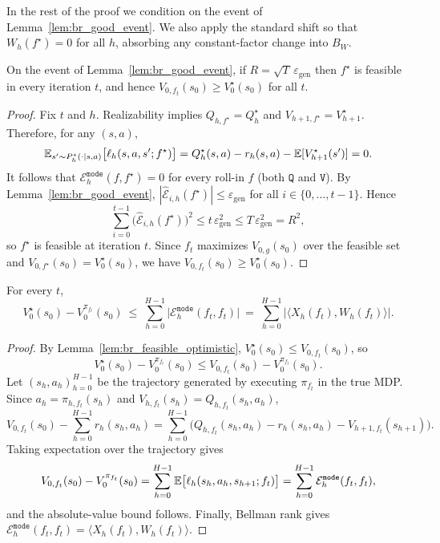 In the rest of the proof we condition on the event of Lemma~\ref{lem:br_good_event}.
We also apply the standard shift so that $W_h(f^\star)=0$ for all $h$, absorbing any constant-factor
change into $B_W$.

\begin{lemma}
\label{lem:br_feasible_optimistic}
On the event of Lemma~\ref{lem:br_good_event}, if $R=\sqrt{T}\,\varepsilon_{\mathrm{gen}}$ then
$f^\star$ is feasible in every iteration $t$, and hence $V_{0,f_t}(s_0)\ge V_0^\star(s_0)$ for all $t$.
\end{lemma}

\begin{proof}
Fix $t$ and $h$. Realizability implies $Q_{h,f^\star}=Q_h^\star$ and $V_{h+1,f^\star}=V_{h+1}^\star$.
Therefore, for any $(s,a)$,
\[
\mathbb{E}_{s'\sim P_h^\star(\cdot\mid s,a)}\big[\ell_h(s,a,s';f^\star)\big]
=
Q_h^\star(s,a)-r_h(s,a)-\mathbb{E}[V_{h+1}^\star(s')]
=0.
\]
It follows that $\mathcal{E}_h^{\mathtt{mode}}(f,f^\star)=0$ for every roll-in $f$ (both
$\mathtt{Q}$ and $\mathtt{V}$). By Lemma~\ref{lem:br_good_event},
$|\widehat{\mathcal{E}}_{i,h}(f^\star)|\le \varepsilon_{\mathrm{gen}}$ for all $i\in\{0,\dots,t-1\}$.
Hence
\[
\sum_{i=0}^{t-1}\big(\widehat{\mathcal{E}}_{i,h}(f^\star)\big)^2
\le
t\,\varepsilon_{\mathrm{gen}}^2
\le
T\,\varepsilon_{\mathrm{gen}}^2
=R^2,
\]
so $f^\star$ is feasible at iteration $t$. Since $f_t$ maximizes $V_{0,g}(s_0)$ over the feasible set and
$V_{0,f^\star}(s_0)=V_0^\star(s_0)$, we have $V_{0,f_t}(s_0)\ge V_0^\star(s_0)$.
\end{proof}

\begin{lemma}
\label{lem:br_perf_decomp}
For every $t$,
\[
V_0^\star(s_0)-V_0^{\pi_{f_t}}(s_0)
\ \le\
\sum_{h=0}^{H-1}\Big|\mathcal{E}^{\mathtt{mode}}_h(f_t,f_t)\Big|
\ =\
\sum_{h=0}^{H-1}\Big|\langle X_h(f_t),W_h(f_t)\rangle\Big|.
\]
\end{lemma}

\begin{proof}
By Lemma~\ref{lem:br_feasible_optimistic}, $V_0^\star(s_0)\le V_{0,f_t}(s_0)$, so
\[
V_0^\star(s_0)-V_0^{\pi_{f_t}}(s_0)\le V_{0,f_t}(s_0)-V_0^{\pi_{f_t}}(s_0).
\]
Let $(s_h,a_h)_{h=0}^{H-1}$ be the trajectory generated by executing $\pi_{f_t}$ in the true MDP.
Since $a_h=\pi_{h,f_t}(s_h)$ and $V_{h,f_t}(s_h)=Q_{h,f_t}(s_h,a_h)$,
\[
V_{0,f_t}(s_0)-\sum_{h=0}^{H-1} r_h(s_h,a_h)
=
\sum_{h=0}^{H-1}\big(Q_{h,f_t}(s_h,a_h)-r_h(s_h,a_h)-V_{h+1,f_t}(s_{h+1})\big).
\]
Taking expectation over the trajectory gives
\[
V_{0,f_t}(s_0)-V_0^{\pi_{f_t}}(s_0)
=
\sum_{h=0}^{H-1}\mathbb{E}\big[\ell_h(s_h,a_h,s_{h+1};f_t)\big]
=
\sum_{h=0}^{H-1}\mathcal{E}^{\mathtt{mode}}_h(f_t,f_t),
\]
and the absolute-value bound follows. Finally, Bellman rank gives
$\mathcal{E}^{\mathtt{mode}}_h(f_t,f_t)=\langle X_h(f_t),W_h(f_t)\rangle$.
\end{proof}


